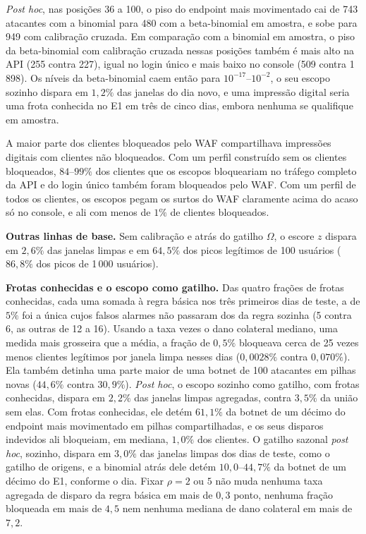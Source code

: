 \documentclass[conference,letterpaper,10pt]{IEEEtran}
\newcommand\1{\textit{(i)}}
\newcommand\2{\textit{(ii)}}
\newcommand\3{\textit{(iii)}}
\begin{document}
\textit{Post hoc}, nas posições 36 a 100, o piso do endpoint mais movimentado cai de 743 atacantes com a binomial para 480 com a beta-binomial em amostra, e sobe para 949 com calibração cruzada. Em comparação com a binomial em amostra, o piso da beta-binomial com calibração cruzada nessas posições também é mais alto na API (255 contra 227), igual no login único e mais baixo no console (509 contra 1\,898). Os níveis da beta-binomial caem então para $10^{-17}$--$10^{-2}$, o seu escopo sozinho dispara em $1{,}2\%$ das janelas do dia novo, e uma impressão digital seria uma frota conhecida no E1 em três de cinco dias, embora nenhuma se qualifique em amostra.

A maior parte dos clientes bloqueados pelo WAF compartilhava impressões digitais com clientes não bloqueados. Com um perfil construído sem os clientes bloqueados, $84$--$99\%$ dos clientes que os escopos bloqueariam no tráfego completo da API e do login único também foram bloqueados pelo WAF. Com um perfil de todos os clientes, os escopos pegam os surtos do WAF claramente acima do acaso só no console, e ali com menos de $1\%$ de clientes bloqueados.

\textbf{Outras linhas de base.} Sem calibração e atrás do gatilho $\Omega$, o escore $z$ dispara em $2{,}6\%$ das janelas limpas e em $64{,}5\%$ dos picos legítimos de 100 usuários ($86{,}8\%$ dos picos de 1\,000 usuários).

\textbf{Frotas conhecidas e o escopo como gatilho.} Das quatro frações de frotas conhecidas, cada uma somada à regra básica nos três primeiros dias de teste, a de $5\%$ foi a única cujos falsos alarmes não passaram dos da regra sozinha (5 contra 6, as outras de 12 a 16). Usando a taxa vezes o dano colateral mediano, uma medida mais grosseira que a média, a fração de $0{,}5\%$ bloqueava cerca de 25 vezes menos clientes legítimos por janela limpa nesses dias ($0{,}0028\%$ contra $0{,}070\%$). Ela também detinha uma parte maior de uma botnet de 100 atacantes em pilhas novas ($44{,}6\%$ contra $30{,}9\%$). \textit{Post hoc}, o escopo sozinho como gatilho, com frotas conhecidas, dispara em $2{,}2\%$ das janelas limpas agregadas, contra $3{,}5\%$ da união sem elas. Com frotas conhecidas, ele detém $61{,}1\%$ da botnet de um décimo do endpoint mais movimentado em pilhas compartilhadas, e os seus disparos indevidos ali bloqueiam, em mediana, $1{,}0\%$ dos clientes. O gatilho sazonal \textit{post hoc}, sozinho, dispara em $3{,}0\%$ das janelas limpas dos dias de teste, como o gatilho de origens, e a binomial atrás dele detém $10{,}0$--$44{,}7\%$ da botnet de um décimo do E1, conforme o dia. Fixar $\rho = 2$ ou $5$ não muda nenhuma taxa agregada de disparo da regra básica em mais de $0{,}3$ ponto, nenhuma fração bloqueada em mais de $4{,}5$ nem nenhuma mediana de dano colateral em mais de $7{,}2$.
\end{document}
